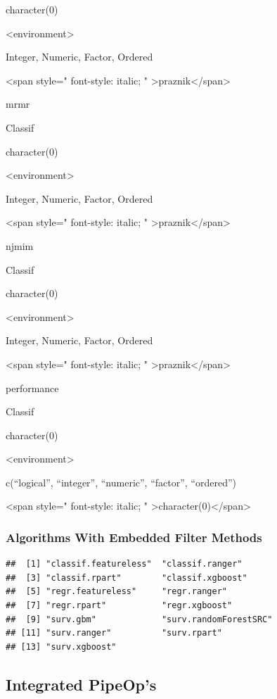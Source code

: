 \documentclass[]{article}
\begin{document}
character(0)

\textless{}environment\textgreater{}

Integer, Numeric, Factor, Ordered

\textless{}span style=" font-style: italic; " \textgreater{}praznik\textless{}/span\textgreater{}

mrmr

Classif

character(0)

\textless{}environment\textgreater{}

Integer, Numeric, Factor, Ordered

\textless{}span style=" font-style: italic; " \textgreater{}praznik\textless{}/span\textgreater{}

njmim

Classif

character(0)

\textless{}environment\textgreater{}

Integer, Numeric, Factor, Ordered

\textless{}span style=" font-style: italic; " \textgreater{}praznik\textless{}/span\textgreater{}

performance

Classif

character(0)

\textless{}environment\textgreater{}

c(``logical'', ``integer'', ``numeric'', ``factor'', ``ordered'')

\textless{}span style=" font-style: italic; " \textgreater{}character(0)\textless{}/span\textgreater{}

\hypertarget{fs-filter-embedded-list}{%
\subsubsection{Algorithms With Embedded Filter Methods}\label{fs-filter-embedded-list}}

\begin{verbatim}
##  [1] "classif.featureless"  "classif.ranger"      
##  [3] "classif.rpart"        "classif.xgboost"     
##  [5] "regr.featureless"     "regr.ranger"         
##  [7] "regr.rpart"           "regr.xgboost"        
##  [9] "surv.gbm"             "surv.randomForestSRC"
## [11] "surv.ranger"          "surv.rpart"          
## [13] "surv.xgboost"
\end{verbatim}

\hypertarget{list-pipeops}{%
\subsection{Integrated PipeOp's}\label{list-pipeops}}
\end{document}
